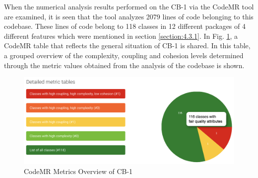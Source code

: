 When the numerical analysis results performed on the CB-1 via the CodeMR tool are examined, it is seen that the tool analyzes 2079 lines of code belonging to this codebase. These lines of code belong to 118 classes in 12 different packages of 4 different features which were mentioned in section \ref{section:4.3.1}. In Fig. \ref{fig:CB-1-metric-table.png}, a CodeMR table that reflects the general situation of CB-1 is shared. In this table, a grouped overview of the complexity, coupling and cohesion levels determined through the metric values obtained from the analysis of the codebase is shown.
\begin{figure}[ht!]
    \centering
    \includegraphics[scale=0.45]{figures/CB-1-metric-table.png}
    \caption{CodeMR Metrics Overview of CB-1}
    \label{fig:CB-1-metric-table.png}
\end{figure}
\FloatBarrier
